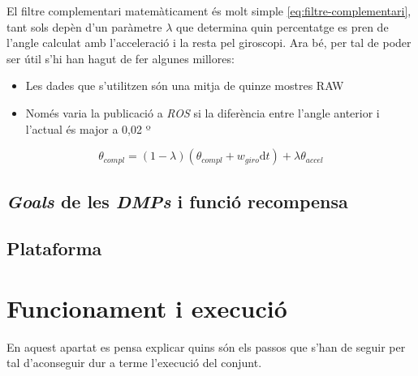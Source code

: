 \documentclass[12pt,a4paper,final,twoside]{article}
\begin{document}
El filtre complementari matemàticament és molt simple \eqref{eq:filtre-complementari}, tant sols depèn d'un paràmetre $\lambda$ que determina quin percentatge es pren de l'angle calculat amb l'acceleració i la resta pel giroscopi. Ara bé, per tal de poder ser útil s'hi han hagut de fer algunes millores:

\begin{itemize}
\item Les dades que s'utilitzen són una mitja de quinze mostres RAW
\item Només varia la publicació a \textit{ROS} si la diferència entre l'angle anterior i l'actual és major a 0,02 º
\end{itemize}

\begin{equation} 
\theta_{compl} = (1 - \lambda)(\theta_{compl} + w_{giro}\mathrm{d}t) + \lambda \theta_{accel} \label{eq:filtre-complementari}
\end{equation}


\subsection{\textit{Goals} de les \textit{DMPs} i funció recompensa}

\subsection{Plataforma}

\section{Funcionament i execució}

En aquest apartat es pensa explicar quins són els passos que s'han de seguir per tal d'aconseguir dur a terme l'execució del conjunt.
\end{document}
